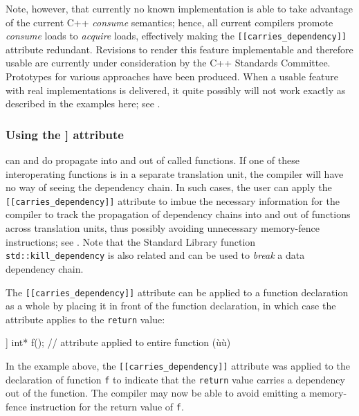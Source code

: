 Note, however, that currently no known implementation is able to take
advantage of the current C++ \emph{consume} semantics; hence, all
current compilers promote \emph{consume} loads to \emph{acquire} loads,
effectively making the \lstinline![[carries_dependency]]! attribute
redundant. Revisions to render this feature implementable and therefore
usable are currently under consideration by the C++ Standards Committee.
Prototypes for various approaches have been produced. When a usable
feature with real implementations is delivered, it quite possibly will
not work exactly as described in the examples here; see . 

\subsubsection[Using the {\protect\lstinline![[carries_dependency]]!} attribute]{Using the {\SubsubsecCode [[carries\_dependency]]} attribute}\label{using-the-[[carries_dependency]]-attribute}

 can and do propagate into and out of
called functions. If one of these interoperating functions is in a
separate translation unit, the compiler will have no way of seeing the
dependency chain. In such cases, the user can apply the
\lstinline![[carries_dependency]]! attribute to imbue the necessary
information for the compiler to track the propagation of dependency
chains into and out of functions across translation units, thus possibly
avoiding unnecessary memory-fence instructions; see . Note that the Standard Library function
\lstinline!std::kill_dependency! is also related and can be used to
  \emph{break} a data dependency chain.

The \lstinline![[carries_dependency]]! attribute can be applied to a
function declaration as a whole by placing it in front of the function declaration,
in which case the attribute applies to the \lstinline!return! value:

\begin{emcppslisting}
[[carries_dependency]] int* f();  // attribute applied to entire function (ù{}ù)
\end{emcppslisting}
    
\noindent In the example above, the \lstinline![[carries_dependency]]! attribute was
applied to the declaration of function \lstinline!f! to indicate that the
\lstinline!return! value carries a dependency out of the function. The
compiler may now be able to avoid emitting a memory-fence instruction
for the return value of \lstinline!f!.

